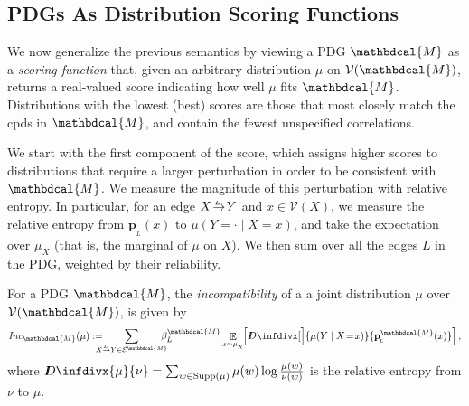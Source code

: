 \documentclass[letterpaper]{article} %
\theoremstyle{plain}
\theoremstyle{definition}
\theoremstyle{remark}
\DeclareMathOperator*{\Ex}{\mathbb{E}} %
\newcommand\mat[1]{\mathbf{#1}}
\newcommand{\thickD}{I\mkern-8muD}
\newcommand{\kldiv}{\thickD\infdivx}
\def\sheq{\!=\!}
\newcommand{\bp}[1][L]{\mat{p}_{\!_{#1}\!}}
\newcommand{\V}{\mathcal V}
\newcommand{\N}{\mathcal N}
\newcommand{\Ed}{\mathcal E}
\newcommand{\pdgvars}[1][]{(\N#1, \Ed#1, \V#1, \mat p#1, \beta#1)}
\newcommand{\dg}[1]{\mathbdcal{#1}}
\newcommand\Inc{\mathit{Inc}}
\newcommand{\ed}[3]{#2\!%
  \overset{\smash{\mskip-5mu\raisebox{-1pt}{$\scriptscriptstyle
        #1$}}}{\rightarrow}\! #3}
\newcommand\vfull[1]{} %
\begin{document}
\subsection{PDGs As Distribution Scoring Functions} \label{sec:scoring-semantics}   

We now generalize the previous semantics by viewing a PDG $\dg M$ as a
\emph{scoring function} that, given an arbitrary distribution $\mu$ on $\V(\dg
M)$, returns a real-valued score indicating how well $\mu$ fits $\dg M$.
Distributions with the lowest (best) scores are those that most closely match
the cpds in $\dg M$, and contain the fewest unspecified correlations.

We start with the first component of the score, which assigns higher scores to
distributions that require a larger perturbation in order to be consistent with
$\dg M$.  
We measure the magnitude of this perturbation with relative entropy. In
particular, for an edge $\ed LXY$ and $x \in \V(X)$, we measure
the relative entropy from $\bp(x)$ to $\mu(Y \!= \cdot\mid X=x)$, and take the
expectation over $\mu_X$ (that is, the marginal of $\mu$ on $X$). We then sum
over all the edges $L$ in the PDG, weighted by their reliability.


\begin{defn}\label{def:inc}
    For a PDG $\dg M$, the \emph{incompatibility} of a
    a joint distribution $\mu$ over $\V(\dg M)$, is given by
    \[
	\Inc_{\dg M }( \mu) := 
		\!\!\!\!\!\!\sum_{\ed L{X\,}{\,Y} \in \Ed^{\dg M}} \!\!\!\!\!\beta_L^{\dg M} \Ex_{x \sim \mu_{_X}}\!\!
\left[\kldiv[\Big]{ \mu(Y \mid X \sheq x) }{\bp^{\dg M}(x) } \right] , \]
	where $\kldiv{\mu}{\nu} = \sum_{w \in \text{Supp($\mu$)}} \mu(w) \log\frac{\mu(w)}{\nu(w)}$ is the 
	relative entropy from $\nu$ to $\mu$.
\vfull{
	The \emph{inconsistency of PDG $\dg M = \pdgvars[]$}, denoted $\Inc(\dg M)$, is the minimum possible incompatibility of $\dg M$ with any distribution $\mu$,  
	\[ \Inc(\dg M) = \inf_{ \mu \in \Delta [W_{\cal V}]} \Inc_{\dg M}(\mu) . \]
}
\end{defn}
\end{document}
